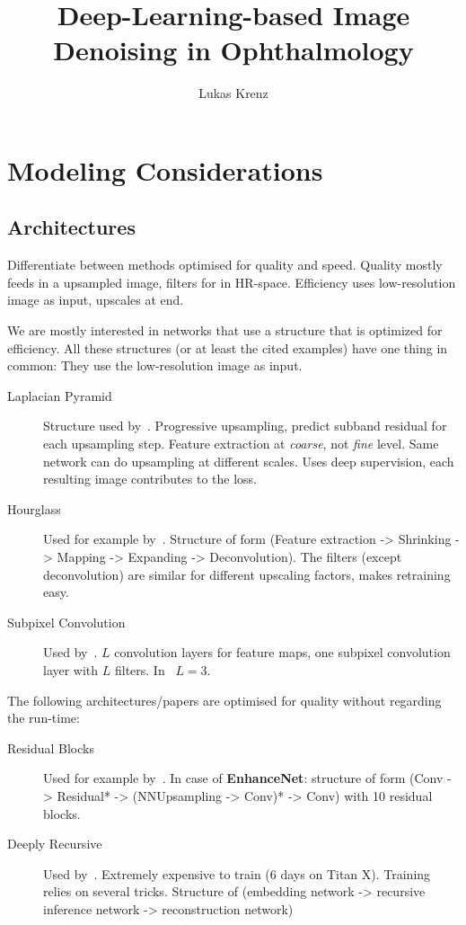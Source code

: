 \documentclass{scrartcl}
\begin{document}
\title{Deep-Learning-based Image Denoising in Ophthalmology}
\author{Lukas Krenz}

\maketitle

\section{Modeling Considerations}

\subsection{Architectures}
\label{sec:architecturs}
Differentiate between methods optimised for quality and speed.
Quality mostly feeds in a upsampled image, filters for in HR-space.
Efficiency uses low-resolution image as input, upscales at end.

We are mostly interested in networks that use a structure that is optimized for efficiency.
All these structures (or at least the cited examples) have one thing in common:
They use the low-resolution image as input.
\begin{description}
\item[Laplacian Pyramid] Structure used by~\cite{LapSRN}.
  Progressive upsampling, predict subband residual for each upsampling step.
  Feature extraction at \textit{coarse}, not \textit{fine} level.
  Same network can do upsampling at different scales.
  Uses deep supervision, each resulting image contributes to the loss.
\item[Hourglass] Used for example by~\cite{Fsrcnn}.
  Structure of form (Feature extraction -> Shrinking -> Mapping -> Expanding -> Deconvolution).
  The filters (except deconvolution) are similar for different upscaling factors, makes retraining easy.
\item[Subpixel Convolution]  Used by~\cite{Espcn}.
  $L$ convolution layers for feature maps, one subpixel convolution layer with $L$ filters.
  In~\cite{Espcn} $L = 3$.
\end{description}

The following architectures/papers are optimised for quality without regarding the run-time:
\begin{description}
\item[Residual Blocks] Used for example by~\cite{EnhanceNet, SRGAN, EDSR}.
   In case of \textbf{EnhanceNet}: structure of form (Conv -> Residual* -> (NNUpsampling -> Conv)* -> Conv) with 10 residual blocks.
  
\item[Deeply Recursive] Used by~\cite{DRCN}.
  Extremely expensive to train (6 days on Titan X).
  Training relies on several tricks.
  Structure of (embedding network -> recursive inference network -> reconstruction network)
\end{description}
\end{document}
